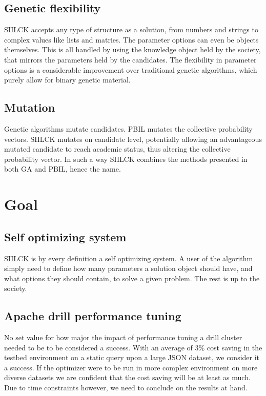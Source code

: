 \documentclass[a4paper,english]{report}
\begin{document}
		\subsection{Genetic flexibility}
		SIILCK accepts any type of structure as a solution, from numbers and strings to complex values like lists and matries. The parameter options can even be objects themselves. This is all handled by using the knowledge object held by the society, that mirrors the parameters held by the candidates. The flexibility in parameter options is a considerable improvement over traditional genetic algorithms, which purely allow for binary genetic material.
		\subsection{Mutation}
		Genetic algorithms mutate candidates. PBIL mutates the collective probability vectors. SIILCK mutates on candidate level, potentially allowing an advantageous mutated candidate to reach academic status, thus altering the collective probability vector. In such a way SIILCK combines the methods presented in both GA and PBIL, hence the name.
		\clearpage
		\section{Goal}
		\subsection{Self optimizing system}
		SIILCK is by every definition a self optimizing system. A user of the algorithm simply need to define how many parameters a solution object should have, and what options they should contain, to solve a given problem. The rest is up to the society.
		\subsection{Apache drill performance tuning}
		No set value for how major the impact of performance tuning a drill cluster needed to be to be considered a success. With an average of 3\% cost saving in the testbed environment on a static query upon a large JSON dataset, we consider it a success. If the optimizer were to be run in more complex environment on more diverse datasets we are confident that the cost saving will be at least as much. Due to time constraints however, we need to conclude on the results at hand.
\end{document}
